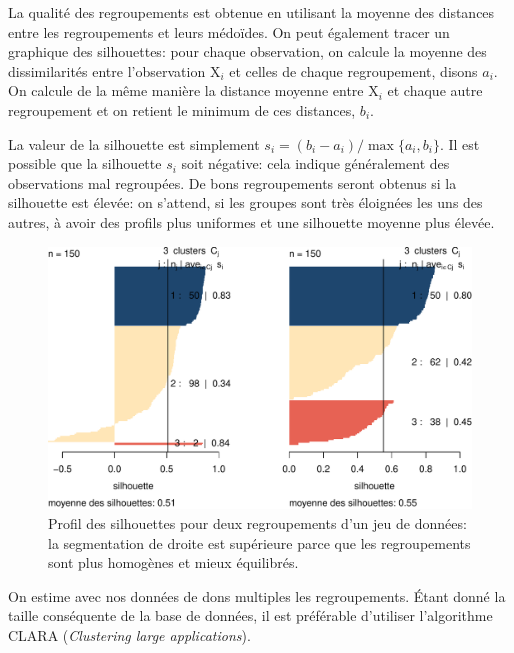 \documentclass[
  11pt,
  letterpaper,
]{book}
\theoremstyle{definition}
\theoremstyle{remark}
\begin{document}
La qualité des regroupements est obtenue en utilisant la moyenne des
distances entre les regroupements et leurs médoïdes. On peut également
tracer un graphique des silhouettes: pour chaque observation, on calcule
la moyenne des dissimilarités entre l'observation \(\mathrm{X}_i\) et
celles de chaque regroupement, disons \(a_i\). On calcule de la même
manière la distance moyenne entre \(\mathrm{X}_i\) et chaque autre
regroupement et on retient le minimum de ces distances, \(b_i\).

La valeur de la silhouette est simplement
\(s_i=(b_i-a_i)/\max\{a_i, b_i\}\). Il est possible que la silhouette
\(s_i\) soit négative: cela indique généralement des observations mal
regroupées. De bons regroupements seront obtenus si la silhouette est
élevée: on s'attend, si les groupes sont très éloignées les uns des
autres, à avoir des profils plus uniformes et une silhouette moyenne
plus élevée.

\begin{figure}[ht!]

{\centering \includegraphics[width=1\textwidth,height=\textheight]{./03-regroupements_files/figure-pdf/fig-silhouette-1.pdf}

}

\caption{\label{fig-silhouette}Profil des silhouettes pour deux
regroupements d'un jeu de données: la segmentation de droite est
supérieure parce que les regroupements sont plus homogènes et mieux
équilibrés.}

\end{figure}

On estime avec nos données de dons multiples les regroupements. Étant
donné la taille conséquente de la base de données, il est préférable
d'utiliser l'algorithme CLARA (\emph{Clustering large applications}).
\end{document}
